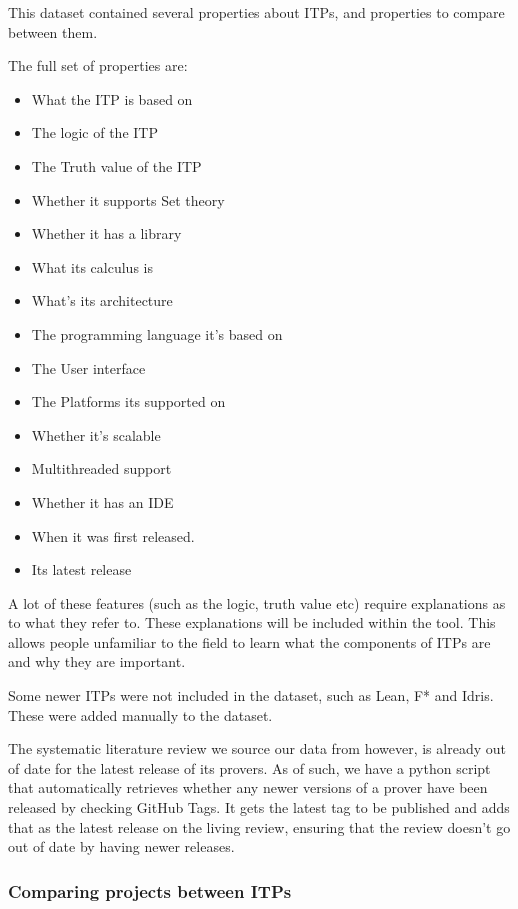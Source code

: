 \documentclass[
]{article}
\providecommand{\tightlist}{%
  \setlength{\itemsep}{0pt}\setlength{\parskip}{0pt}}
\begin{document}
This dataset contained several properties about ITPs, and properties to
compare between them.

The full set of properties are:

\begin{itemize}
\tightlist
\item
  What the ITP is based on
\item
  The logic of the ITP
\item
  The Truth value of the ITP
\item
  Whether it supports Set theory
\item
  Whether it has a library
\item
  What its calculus is
\item
  What's its architecture
\item
  The programming language it's based on
\item
  The User interface
\item
  The Platforms its supported on
\item
  Whether it's scalable
\item
  Multithreaded support
\item
  Whether it has an IDE
\item
  When it was first released.
\item
  Its latest release
\end{itemize}

A lot of these features (such as the logic, truth value etc) require
explanations as to what they refer to. These explanations will be
included within the tool. This allows people unfamiliar to the field to
learn what the components of ITPs are and why they are important.

Some newer ITPs were not included in the dataset, such as Lean, F* and
Idris. These were added manually to the dataset.

The systematic literature review we source our data from however, is
already out of date for the latest release of its provers. As of such,
we have a python script that automatically retrieves whether any newer
versions of a prover have been released by checking GitHub Tags. It gets
the latest tag to be published and adds that as the latest release on
the living review, ensuring that the review doesn't go out of date by
having newer releases.

\hypertarget{comparing-projects-between-itps}{%
\subsubsection{Comparing projects between
ITPs}\label{comparing-projects-between-itps}}
\end{document}
